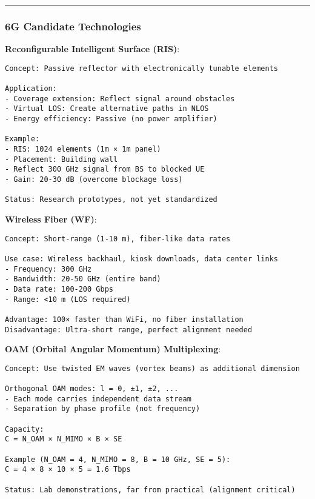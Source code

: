 \begin{center}\rule{0.5\linewidth}{0.5pt}\end{center}

\subsubsection{6G Candidate
Technologies}\label{g-candidate-technologies}

\textbf{Reconfigurable Intelligent Surface (RIS)}:

\begin{verbatim}
Concept: Passive reflector with electronically tunable elements

Application:
- Coverage extension: Reflect signal around obstacles
- Virtual LOS: Create alternative paths in NLOS
- Energy efficiency: Passive (no power amplifier)

Example:
- RIS: 1024 elements (1m × 1m panel)
- Placement: Building wall
- Reflect 300 GHz signal from BS to blocked UE
- Gain: 20-30 dB (overcome blockage loss)

Status: Research prototypes, not yet standardized
\end{verbatim}

\textbf{Wireless Fiber (WF)}:

\begin{verbatim}
Concept: Short-range (1-10 m), fiber-like data rates

Use case: Wireless backhaul, kiosk downloads, data center links
- Frequency: 300 GHz
- Bandwidth: 20-50 GHz (entire band)
- Data rate: 100-200 Gbps
- Range: <10 m (LOS required)

Advantage: 100× faster than WiFi, no fiber installation
Disadvantage: Ultra-short range, perfect alignment needed
\end{verbatim}

\textbf{OAM (Orbital Angular Momentum) Multiplexing}:

\begin{verbatim}
Concept: Use twisted EM waves (vortex beams) as additional dimension

Orthogonal OAM modes: l = 0, ±1, ±2, ...
- Each mode carries independent data stream
- Separation by phase profile (not frequency)

Capacity:
C = N_OAM × N_MIMO × B × SE

Example (N_OAM = 4, N_MIMO = 8, B = 10 GHz, SE = 5):
C = 4 × 8 × 10 × 5 = 1.6 Tbps

Status: Lab demonstrations, far from practical (alignment critical)
\end{verbatim}

